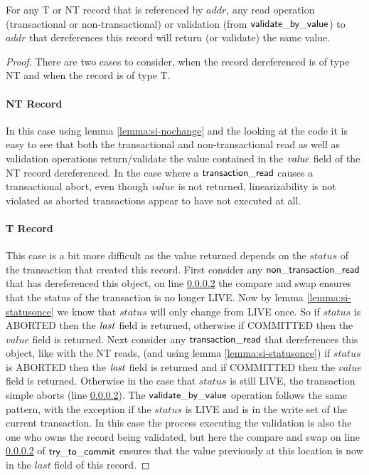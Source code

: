\begin{lemma}
\label{lemma:si-samevalue}
For any T or NT record that is referenced by $\mathit{addr}$, any read operation (transactional or non-transactional) or validation (from $\sf{validate\_by\_value}$) to
$\mathit{addr}$ that dereferences this record will return (or validate) the same value.
\end{lemma}
\begin{proof}
There are two cases to consider, when the record dereferenced is of type NT and when the record is of type T.
\paragraph{NT Record} In this case using lemma \ref{lemma:si-nochange} and the looking at the code it is easy to see that both the transactional and non-transactional read
as well as validation operations
return/validate the value contained in the $\ms{value}$ field of the NT record dereferenced.
In the case where a $\sf{transaction\_read}$ causes a transactional abort, even though $\mathit{value}$ is not returned, linearizability is not violated
as aborted transactions appear to have not executed at all.
\paragraph{T Record} This case is a bit more difficult as the value returned depends on the $\mathit{status}$ of the transaction
that created this record.
First consider any $\sf{non\_transaction\_read}$ that has dereferenced this object, on line \ref{} the compare and swap ensures that the status of the transaction is
no longer LIVE.
Now by lemma \ref{lemma:si-statusonce} we know that $\mathit{status}$ will only change from LIVE once.
So if $\mathit{status}$ is ABORTED then the $\ms{last}$ field is returned, otherwise if COMMITTED then the $\mathit{value}$ field is returned.
Next consider any $\sf{transaction\_read}$ that dereferences this object, like with the NT reads,
(and using lemma \ref{lemma:si-statusonce}) if
$\mathit{status}$ is ABORTED then the $\ms{last}$ field is returned and if COMMITTED then the $\mathit{value}$ field is returned.
Otherwise in the case that $\mathit{status}$ is still LIVE, the transaction simple aborts (line \ref{}).
The $\sf{validate\_by\_value}$ operation follows the same pattern, with the exception if the $\mathit{status}$ is LIVE and
is in the write set of the current transaction.
In this case the process executing the validation is also the one who owns the record being validated, but here the compare
and swap on line \ref{} of $\sf{try\_to\_commit}$ ensures that the value previously at this location is now in the $\mathit{last}$
field of this record.
\end{proof}




